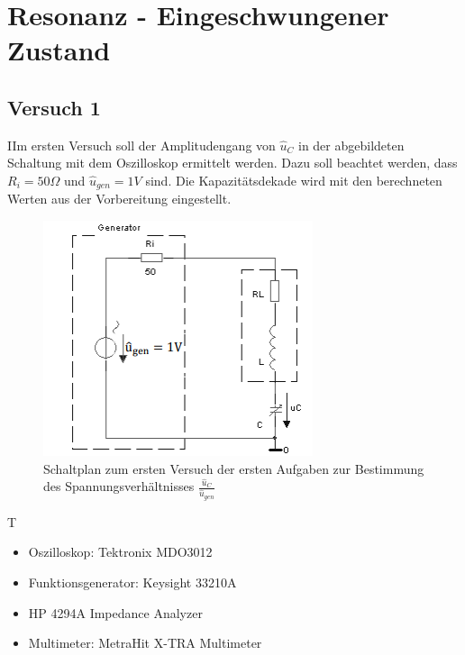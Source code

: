 \documentclass{article}
\begin{document}
\section{Resonanz - Eingeschwungener Zustand}
\subsection{Versuch 1}
\begin{task}
  IIm ersten Versuch soll der Amplitudengang von $\hat{u}_C$ in der abgebildeten Schaltung mit dem Oszilloskop ermittelt werden. Dazu soll beachtet werden,
  dass $R_i = 50\Omega$ und $\hat{u}_{gen} = 1V$ sind. Die Kapazitätsdekade wird mit den berechneten Werten aus der Vorbereitung eingestellt.
\end{task}

\begin{figure}[h]
  \begin{center}
    \includegraphics{../assets/images/ETP3/Versuch1Schaltplan.PNG}
    \caption{Schaltplan zum ersten Versuch der ersten Aufgaben zur Bestimmung des Spannungsverhältnisses $\frac{\hat{u}_C}{\hat{u}_{gen}}$}
  \end{center}
\end{figure}

\begin{devlist}
  T
  \begin{itemize}
    \item Oszilloskop: Tektronix MDO3012
    \item Funktionsgenerator: Keysight 33210A
    \item HP 4294A Impedance Analyzer
    \item Multimeter: MetraHit X-TRA Multimeter
  \end{itemize}
\end{devlist}

\newpage
\end{document}
